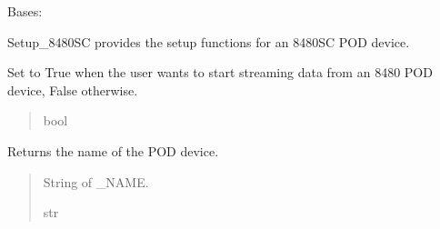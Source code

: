 \documentclass[letterpaper,10pt,english]{sphinxmanual}
\begin{document}
\begin{fulllineitems}
\label{\detokenize{Setup_8480SC:Setup_8480SC.Setup_8480SC}}
\pysigstartsignatures
{}
\pysigstopsignatures
\sphinxAtStartPar
Bases: {\hyperref[\detokenize{Setup_PodInterface:Setup_PodInterface.Setup_Interface}]{}}

\sphinxAtStartPar
Setup\_8480SC provides the setup functions for an 8480\sphinxhyphen{}SC POD device.

\begin{fulllineitems}
\label{\detokenize{Setup_8480SC:Setup_8480SC.Setup_8480SC._streamMode}}
\pysigstartsignatures
{}
\pysigstopsignatures
\sphinxAtStartPar
Set to True when the user wants to start streaming data from             an 8480 POD device, False otherwise.
\begin{quote}\begin{description}
\sphinxAtStartPar
bool

\end{description}\end{quote}

\end{fulllineitems}


\begin{fulllineitems}
\label{\detokenize{Setup_8480SC:Setup_8480SC.Setup_8480SC.GetDeviceName}}
\pysigstartsignatures
{}
\pysigstopsignatures
\sphinxAtStartPar
Returns the name of the POD device.
\begin{quote}\begin{description}
\sphinxAtStartPar
String of \_NAME.

\sphinxAtStartPar
str

\end{description}\end{quote}


\end{fulllineitems}
\end{fulllineitems}
\end{document}
